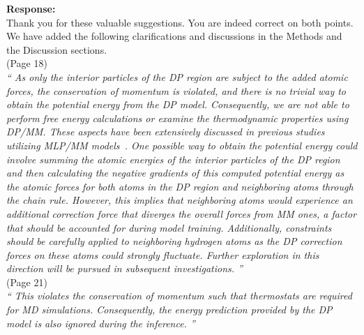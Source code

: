 \documentclass[doublespace,prb,aps,preprint]{revtex4}
\newcommand{\Quote}[1]{\textsl{``#1''}}
\newenvironment{Reply}{  {\bf Response: \\}  \setlength{\parindent}{1cm} \normalfont }{ \ignorespacesafterend \vspace{5mm}}
\newcommand{\HJ}[1]{\textcolor{red}{#1}}
\begin{document}
\begin{Reply}
    Thank you for these valuable suggestions. You are indeed correct on both points. We have added the following clarifications and discussions in the Methods and the Discussion sections. \\
    \newline
    (Page 18) \\
    \Quote{ 
    As only the interior particles of the DP region are subject to the added atomic forces, the conservation of momentum is violated,  and there is no trivial way to obtain the potential energy from the DP model. 
    Consequently, we are not able to perform free energy calculations or examine the thermodynamic properties using DP/MM. 
    These aspects have been extensively discussed in previous studies utilizing MLP/MM models~\cite{giese2022combined}. 
    One possible way to obtain the potential energy could involve summing the atomic energies of the interior particles of the DP region and then calculating the negative gradients of this computed potential energy 
    as the atomic forces for both atoms in the DP region and neighboring atoms through the chain rule. 
    However, this implies that neighboring atoms would experience an additional correction force that diverges the overall forces from MM ones, a factor that should be accounted for during model training. 
    Additionally, constraints should be carefully applied to neighboring hydrogen atoms as the DP correction forces on these atoms could strongly fluctuate.  
    Further exploration in this direction will be pursued in subsequent investigations.
    }    \\
    (Page 21) \\
    \Quote{
        This violates the conservation of momentum such that thermostats are required for MD simulations. Consequently, the energy prediction provided by the DP model is also ignored during the inference.
    }    
\end{Reply}
\end{document}
